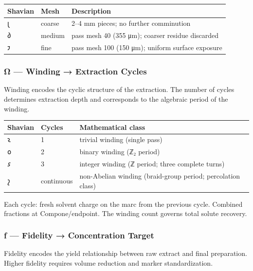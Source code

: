 \begin{longtable}[]{@{}lll@{}}
\toprule
Shavian & Mesh & Description\tabularnewline
\midrule
\endhead
𐑚 & coarse & 2--4 mm pieces; no further comminution\tabularnewline
𐑔 & medium & pass mesh 40 (355 μm); coarser residue
discarded\tabularnewline
𐑲 & fine & pass mesh 100 (150 μm); uniform surface
exposure\tabularnewline
\bottomrule
\end{longtable}

\hypertarget{ux3c9-winding-extraction-cycles}{%
\subsubsection{Ω --- Winding → Extraction
Cycles}\label{ux3c9-winding-extraction-cycles}}

Winding encodes the cyclic structure of the extraction. The number of
cycles determines extraction depth and corresponds to the algebraic
period of the winding.

\begin{longtable}[]{@{}lll@{}}
\toprule
Shavian & Cycles & Mathematical class\tabularnewline
\midrule
\endhead
𐑷 & 1 & trivial winding (single pass)\tabularnewline
𐑴 & 2 & binary winding (ℤ₂ period)\tabularnewline
𐑭 & 3 & integer winding (ℤ period; three complete turns)\tabularnewline
𐑟 & continuous & non-Abelian winding (braid-group period; percolation
class)\tabularnewline
\bottomrule
\end{longtable}

Each cycle: fresh solvent charge on the marc from the previous cycle.
Combined fractions at Compone/endpoint. The winding count governs total
solute recovery.

\hypertarget{ux192-fidelity-concentration-target}{%
\subsubsection{ƒ --- Fidelity → Concentration
Target}\label{ux192-fidelity-concentration-target}}

Fidelity encodes the yield relationship between raw extract and final
preparation. Higher fidelity requires volume reduction and marker
standardization.


